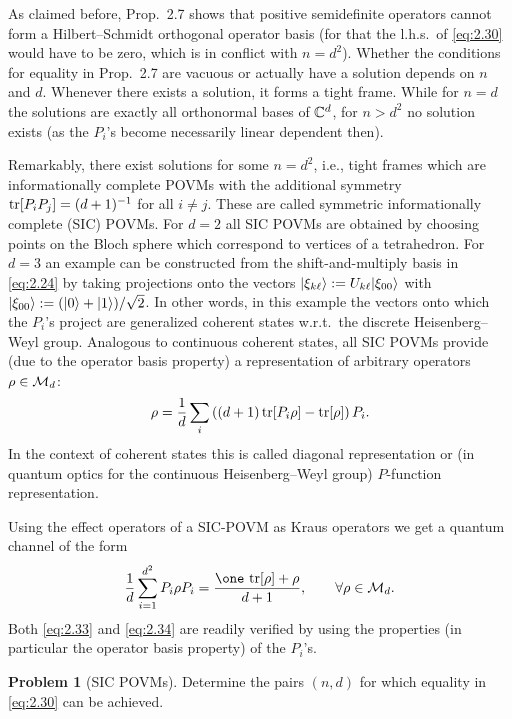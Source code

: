 \documentclass[11pt,a4paper]{article}
\numberwithin{equation}{section}
\theoremstyle{plain}
\theoremstyle{definition}
\newtheorem{problem}{Problem} %
\begin{document}
As claimed before, Prop.~2.7 shows that positive semidefinite operators cannot form
a Hilbert--Schmidt orthogonal operator basis (for that the l.h.s.\ of
\eqref{eq:2.30} would have to be zero, which is in conflict with $n=d^2$). Whether
the conditions for equality in Prop.~2.7 are vacuous or actually have a solution
depends on $n$ and $d$. Whenever there exists a solution, it forms a tight frame.
While for $n=d$ the solutions are exactly all orthonormal bases of $\mathbb{C}^d$, for
$n>d^2$ no solution exists (as the $P_i$'s become necessarily linear dependent then).

Remarkably, there exist solutions for some $n=d^2$, i.e., tight frames which are
informationally complete POVMs with the additional symmetry $\operatorname{tr}[P_iP_j]=(d+1)^{-1}$
for all $i\ne j$. These are called symmetric informationally complete (SIC) POVMs.
For $d=2$ all SIC POVMs are obtained by choosing points on the Bloch sphere which
correspond to vertices of a tetrahedron. For $d=3$ an example can be constructed
from the shift-and-multiply basis in \eqref{eq:2.24} by taking projections onto the
vectors $|\xi_{k\ell}\rangle := U_{k\ell}|\xi_{00}\rangle$ with
$|\xi_{00}\rangle := (|0\rangle+|1\rangle)/\sqrt{2}$. In other words, in this example the
vectors onto which the $P_i$'s project are generalized coherent states w.r.t.\ the
discrete Heisenberg--Weyl group. Analogous to continuous coherent states, all SIC
POVMs provide (due to the operator basis property) a representation of arbitrary
operators $\rho\in \mathcal{M}_d$:
\begin{equation}\label{eq:2.33}
    \rho = \frac{1}{d}\sum_i\left((d+1)\operatorname{tr}[P_i\rho] - \operatorname{tr}[\rho]\right) P_i.
\end{equation}
In the context of coherent states this is called diagonal representation or (in
quantum optics for the continuous Heisenberg--Weyl group) $P$-function
representation.

Using the effect operators of a SIC-POVM as Kraus operators we get a quantum channel
of the form
\begin{equation}\label{eq:2.34}
    \frac{1}{d}\sum_{i=1}^{d^2} P_i \rho P_i
    = \frac{\one\,\tr[\rho] + \rho}{d+1}, \qquad \forall \rho\in \mcM_d.
\end{equation}
Both \eqref{eq:2.33} and \eqref{eq:2.34} are readily verified by using the
properties (in particular the operator basis property) of the $P_i$'s.

\begin{problem}[SIC POVMs]
Determine the pairs $(n,d)$ for which equality in \eqref{eq:2.30} can be achieved.
\end{problem}
\end{document}
